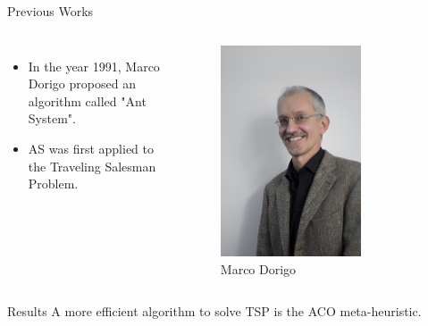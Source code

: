 \documentclass[table]{beamer}
\begin{document}
\begin{frame}{Previous Works}
	\begin{columns}
		\begin{itemize}
			\item In the year 1991, Marco Dorigo proposed an algorithm called "Ant System".
			
			\vspace{\baselineskip}	\vspace{\baselineskip}
			
			\item  AS was first applied to the Traveling Salesman Problem.
			
			
		\end{itemize}
			\begin{figure}[h]
				\centering
				\includegraphics[width=0.7\textwidth]{Dorigo.jpg}
				\caption{Marco Dorigo}
			\end{figure}
	\end{columns}

	
	
\end{frame}

\begin{frame}{Results}
	\centering
	A more efficient algorithm to solve TSP is the ACO meta-heuristic.
\end{frame}
\end{document}
